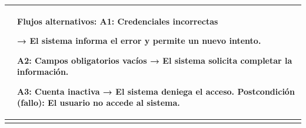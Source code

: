 \documentclass[
]{article}
\newcounter{none} %
\begin{document}
{\def\LTcaptype{none} %
\begin{longtable}[]{@{}
  >{\raggedright\arraybackslash}p{}
  >{\raggedright\arraybackslash}p{}@{}}
\toprule\noalign{}
\begin{minipage}[b]{\linewidth}\raggedright
\end{minipage} & \begin{minipage}[b]{\linewidth}\raggedright
\textbf{Flujos alternativos:} A1: Credenciales incorrectas

→ El sistema informa el error y permite un nuevo intento.

A2: Campos obligatorios vacíos → El sistema solicita completar la
información.

A3: Cuenta inactiva → El sistema deniega el acceso.
\textbf{Postcondición (fallo):} El usuario no accede al sistema.
\end{minipage} \\
\midrule\noalign{}
\endhead
\bottomrule\noalign{}
\endlastfoot
\end{longtable}
}
\end{document}
